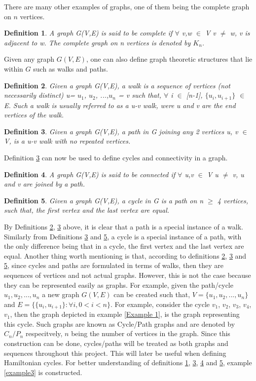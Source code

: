 \documentclass[12pt]{article}
\newtheorem{definition}{Definition}[subsection]
\numberwithin{equation}{subsection}
\numberwithin{table}{subsection}
\begin{document}
There are many other examples of graphs, one of them being the complete graph on $\mathit{n}$ vertices.
\begin{definition}
\label{Complete Graph}
A graph G(V,E) is said to be complete if $\forall$ v,w $\in$ V v $\neq$ w, v is adjacent to w. The complete graph on n vertices is denoted by $K_n$. 
\end{definition}
Given any graph $\mathit{G(V,E)}$, one can also define graph theoretic structures that lie within $\mathit{G}$ such as walks and paths.
\begin{definition}
\label{walk}
Given a graph G(V,E), a walk is a sequence of vertices (not necessarily distinct) u= $u_1$, $u_2$, ...,$u_n$ = v such that, $\forall$ i $\in$ [n-1], $\{u_i, u_{i+1}\}$ $\in$ E. Such a walk is usually referred to as a u-v walk, were u and v are the end vertices of the walk. 
\end{definition}
\begin{definition}
\label{Path}
Given a graph G(V,E), a path in G joining any 2 vertices u, v $\in$ V, is a u-v walk with no repeated vertices.
\end{definition}
Definition \ref{Path} can now be used to define cycles and connectivity in a graph.
\begin{definition}
\label{connectedgraph}
A graph G(V,E) is said to be connected if $\forall$ u,v $\in$ V u $\neq$ v, u and v are joined by a path. 
\end{definition}
\begin{definition}
\label{cycle}
Given a graph G(V,E), a cycle in G is a path on n $\geq$ 4 vertices, such that, the first vertex and the last vertex are equal.  
\end{definition}
By Definitions \ref{walk}, \ref{Path} above, it is clear that a path is a special instance of a walk. Similarly from Definitions \ref{Path} and \ref{cycle}, a cycle is a special instance of a path, with the only difference being that in a cycle, the first vertex and the last vertex are equal. Another thing worth mentioning is that, according to definitions \ref{walk}, \ref{Path} and \ref{cycle}, since cycles and paths are formulated in terms of walks, then they are sequences of vertices and not actual graphs. However, this is not the case because they can be represented easily as graphs. For example, given the path/cycle $\mathit{u_1, u_2, ...,u_n}$ a new graph $\mathit{G(V,E)}$ can be created such that, $\mathit{V= \{ u_1, u_2, ..., u_n\}}$ and $\mathit{E = \{ \{u_i, u_{i+1}\} : \forall i, 0 < i < n\}}$. For example, consider the cycle $v_1$, $v_2$, $v_3$, $v_4$, $v_1$, then the graph depicted in example \ref{Example 1}, is the graph representing this cycle. Such graphs are known as Cycle/Path graphs and are denoted by $\mathit{C_n/P_n}$ respecitvely, $\mathit{n}$ being the number of vertices in the graph. Since this construction can be done, cycles/paths will be treated as both graphs and sequences throughout this project. This will later be useful when defining Hamiltonian cycles. For better understanding of definitions \ref{Complete Graph}, \ref{Path}, \ref{connectedgraph} and \ref{cycle}, example \ref{example3} is constructed.
\end{document}

